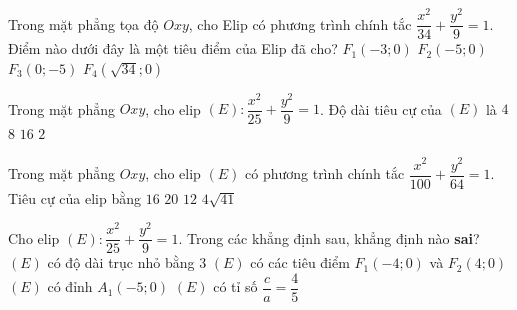\begin{ex}%
	 Trong mặt phẳng tọa độ $Oxy$, cho Elip có phương trình chính tắc $\dfrac{x^2}{34}+\dfrac{y^2}{9}=1$. Điểm nào dưới đây là một tiêu điểm của Elip đã cho?
	 \choice
		{$F_1(-3;0)$} 
		 {\True $F_2(-5;0)$}
		{$F_3(0;-5)$} 
		 {$F_4(\sqrt{34};0)$}
\end{ex}

\begin{ex}%
	Trong mặt phẳng $Oxy$, cho elip $(E)\colon\dfrac{x^2}{25}+\dfrac{y^2}{9}=1$. Độ  dài tiêu cự của $(E)$ là
	\choice 
		{$4$} 
		{\True $8$} 
		{$16$} 
		{$2$} 
\end{ex}

\begin{ex}%
	Trong mặt phẳng  $Oxy$, cho elip $(E)$ có phương trình chính tắc $\dfrac{x^2}{100}+\dfrac{y^2}{64}=1$. Tiêu cự của elip bằng
	\choice 
		{$16$} 
		 {$20$}
		{\True  $12$}
		{$4\sqrt{41}$} 
\end{ex}

\begin{ex}%
	Cho elip $(E)\colon\dfrac{x^2}{25}+\dfrac{y^2}{9}=1$. Trong các khẳng  định sau, khẳng định nào \textbf{sai}?
	\choice 
		{\True $(E)$  có độ dài trục nhỏ bằng $3$}
		{$(E)$ có các tiêu điểm  $F_1(-4;0)$ và $F_2(4;0)$}
		{$(E)$  có đỉnh $A_1(-5;0)$}
		{$(E)$ có tỉ số $\dfrac{c}{a}=\dfrac{4}{5}$} 
\end{ex}

